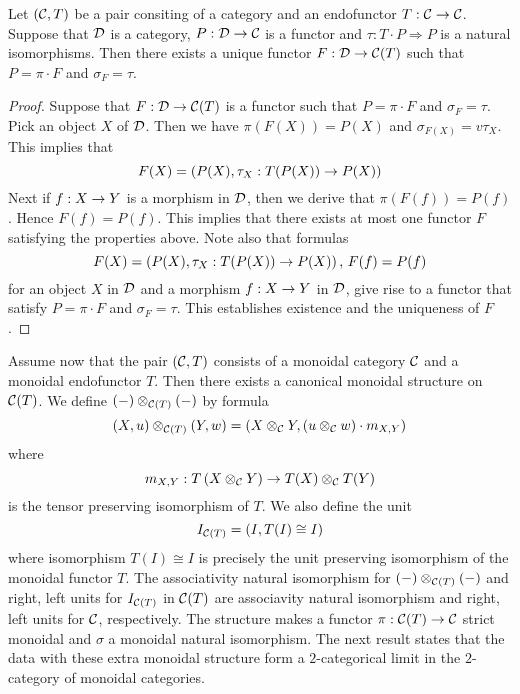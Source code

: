 \begin{theorem}\label{theorem:endoscope_2_limits}
Let $({\mathcal C},T)$ be a pair consiting of a category and an endofunctor $T:{\mathcal C}\rightarrow {\mathcal C}$. Suppose that ${\mathcal D}$ is a category, $P:{\mathcal D}\rightarrow {\mathcal C}$ is a functor and $\tau:T\cdot P \Rightarrow P$ is a natural isomorphisms. Then there exists a unique functor $F:{\mathcal D}\rightarrow {\mathcal C}(T)$ such that $P = \pi\cdot F$ and $\sigma_F = \tau$.
\end{theorem}
\begin{proof}
Suppose that $F:{\mathcal D}\rightarrow {\mathcal C}(T)$ is a functor such that $P = \pi\cdot F$ and $\sigma_F = \tau$. Pick an object $X$ of ${\mathcal D}$. Then we have $\pi\left(F(X)\right) = P(X)$ and $\sigma_{F(X)} = v\tau_X$. This implies that
$$F(X) = \left(P(X),\tau_X:T(P(X))\rightarrow P(X)\right)$$
Next if $f:X\rightarrow Y$ is a morphism in ${\mathcal D}$, then we derive that $\pi(F(f)) = P(f)$. Hence $F(f) = P(f)$. This implies that there exists at most one functor $F$ satisfying the properties above. Note also that formulas
$$F(X) = \left(P(X),\tau_X:T(P(X))\rightarrow P(X)\right),\,F(f) = P(f)$$
for an object $X$ in ${\mathcal D}$ and a morphism $f:X\rightarrow Y$ in ${\mathcal D}$, give rise to a functor that satisfy $P = \pi\cdot F$ and $\sigma_F = \tau$. This establishes existence and the uniqueness of $F$.
\end{proof}
\noindent
Assume now that the pair $({\mathcal C},T)$ consists of a monoidal category ${\mathcal C}$ and a monoidal endofunctor $T$. Then there exists a canonical monoidal structure on ${\mathcal C}(T)$. We define $(-)\otimes_{{\mathcal C}(T)}(-)$ by formula
$$(X,u) \otimes_{{\mathcal C}(T)}(Y,w) = \left(X\otimes_{{\mathcal C}}Y,\left(u \otimes_{{\mathcal C}} w\right)\cdot m_{X,Y}\right)$$
where
$$m_{X,Y}:T\left(X\otimes_{{\mathcal C}} Y\right) \rightarrow T(X)\otimes_{{\mathcal C}}T(Y)$$
is the tensor preserving isomorphism of $T$. We also define the unit
$$I_{{\mathcal C}(T)} = \left(I, T(I)\cong I\right)$$
where isomorphism $T(I)\cong I$ is precisely the unit preserving isomorphism of the monoidal functor $T$. The associativity natural isomorphism for $(-)\otimes_{{\mathcal C}(T)}(-)$ and right, left units for $I_{{\mathcal C}(T)}$ in ${\mathcal C}(T)$ are associavity natural isomorphism and right, left units for ${\mathcal C}$, respectively. The structure makes a functor $\pi:{\mathcal C}(T)\rightarrow {\mathcal C}$ strict monoidal and $\sigma$ a monoidal natural isomorphism. The next result states that the data with these extra monoidal structure form a $2$-categorical limit in the $2$-category of monoidal categories.

